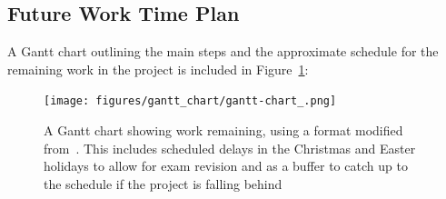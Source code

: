 \documentclass[12pt]{article}
\begin{document}
    \subsection{Future Work Time Plan}
    A Gantt chart outlining the main steps and the approximate schedule for the remaining work in the project is included in Figure~\ref{fig:gantt-chart_}:

    \begin{landscape}
        \begin{figure}[p] %
            \centering
            \texttt{[image: figures/gantt\_chart/gantt-chart\_.png]}
            \caption{A Gantt chart showing work remaining, using a format modified from~\cite{DataCampGanttChart2021}. This includes scheduled delays in the Christmas and Easter holidays to allow for exam revision and as a buffer to catch up to the schedule if the project is falling behind}
            \label{fig:gantt-chart_}
        \end{figure}
    \end{landscape}

%    

    \printbibliography
\end{document}
